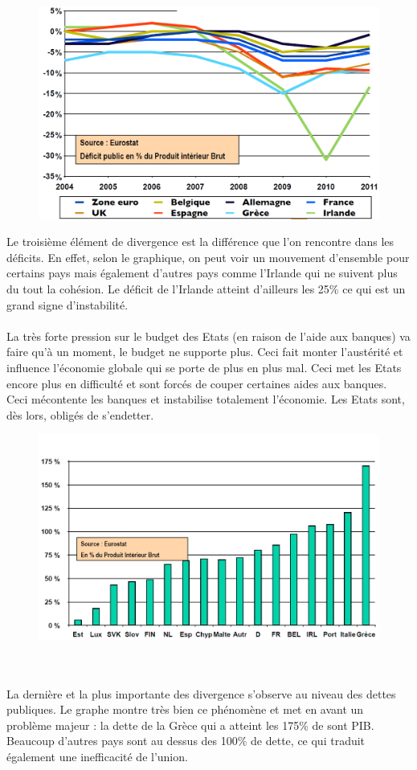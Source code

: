 \begin{figure}
\includegraphics[scale=0.3]{32}
\end{figure}
\noindent Le troisième élément de divergence est la différence que l'on rencontre dans les déficits. En effet, selon le graphique, on peut voir un mouvement d'ensemble pour certains pays mais également d'autres pays comme l'Irlande qui ne suivent plus du tout la cohésion. Le déficit de l'Irlande atteint d'ailleurs les 25\% ce qui est un grand signe d'instabilité. \\\\

La très forte pression sur le budget des Etats (en raison de l'aide aux banques) va faire qu'à un moment, le budget ne supporte plus. Ceci fait monter l'austérité et influence l'économie globale qui se porte de plus en plus mal. Ceci met les Etats encore plus en difficulté  et sont forcés de couper certaines aides aux banques. Ceci mécontente les banques et instabilise totalement l'économie. Les Etats sont, dès lors, obligés de s'endetter.

\begin{figure}
\includegraphics[scale=0.3]{36}
\end{figure}
\ \\ \\ La dernière et la plus importante des divergence s'observe au niveau des dettes publiques. Le graphe montre très bien ce phénomène et met en avant un problème majeur : la dette de la Grèce qui a atteint les 175\% de sont PIB. Beaucoup d'autres pays sont au dessus des 100\% de dette, ce qui traduit également une inefficacité de l'union.


